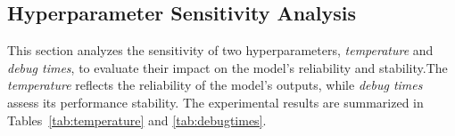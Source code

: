 


\subsection{Hyperparameter Sensitivity Analysis}
\label{appendix:sensitivity}
This section analyzes the sensitivity of two hyperparameters, \textit{temperature} and \textit{debug times}, to evaluate their impact on the model's reliability and stability.The \textit{temperature} reflects the reliability of the model’s outputs, while \textit{debug times} assess its performance stability. The experimental results are summarized in Tables~\ref{tab:temperature} and \ref{tab:debugtimes}.

